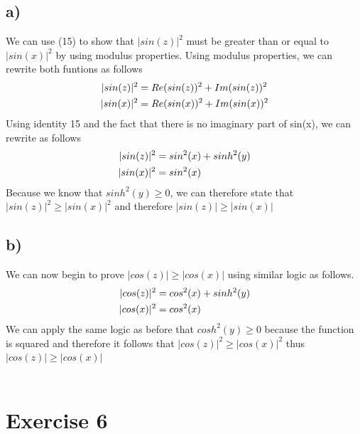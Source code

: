 \documentclass[notitlepage]{article}
\newcommand{\HwBreak}{%
  \par\noindent\makebox[\linewidth]{\rule{0.9\paperwidth}{0.4pt}}\par%
}
\begin{document}
    \subsection*{a)}
    We can use (15) to show that $|sin(z)|^2$ must be greater than or equal to $|sin(x)|^2$ by using modulus properties.
    Using modulus properties, we can rewrite both funtions as follows
\begin{equation}
    \begin{aligned}
        |sin(z)|^2  &= Re(sin(z))^2+Im(sin(z))^2 \notag \\
        |sin(x)|^2  &= Re(sin(x))^2 + Im(sin(x))^2
    \end{aligned}
\end{equation}
    Using identity 15 and the fact that there is no imaginary part of sin(x), we can rewrite as follows
\begin{equation}
    \begin{aligned}
        |sin(z)|^2  &= sin^2(x) + sinh^2(y) \notag \\
        |sin(x)|^2  &= sin^2(x)
    \end{aligned}
\end{equation}
    Because we know that $sinh^2(y) \geq 0$, we can therefore state that $|sin(z)|^2 \geq |sin(x)|^2$ and therefore $|sin(z)| \geq |sin(x)|$

    \subsection*{b)}
    We can now begin to prove $|cos(z)| \geq |cos(x)|$ using similar logic as follows.
\begin{equation}
    \begin{aligned}
        |cos(z)|^2  &= cos^2(x)+sinh^2(y) \notag \\
        |cos(x)|^2  &= cos^2(x)
    \end{aligned}
\end{equation}
    We can apply the same logic as before that $cosh^2(y) \geq 0$ because the function is squared and therefore it follows that
    $|cos(z)|^2 \geq |cos(x)|^2$ thus $|cos(z)| \geq |cos(x)|$ \\~\\

\HwBreak
\section*{Exercise 6}
\end{document}
